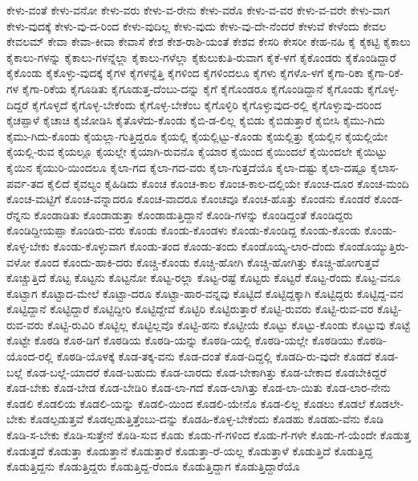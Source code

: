 {ಕೇಳು-ವಂತೆ
ಕೇಳು-ವನೋ
ಕೇಳು-ವರು
ಕೇಳು-ವ-ರೇನು
ಕೇಳು-ವರೊ
ಕೇಳು-ವ-ವರ
ಕೇಳು-ವ-ವರೇ
ಕೇಳು-ವಾಗ
ಕೇಳು-ವುದಕ್ಕೆ
ಕೇಳು-ವು-ದ-ರಿಂದ
ಕೇಳು-ವುದಿಲ್ಲ
ಕೇಳು-ವುದು
ಕೇಳು-ವು-ದೇ-ನೆಂದರೆ
ಕೇಳುವೆ
ಕೇಳೆಂದು
ಕೇವಲ
ಕೇವಲಮ್
ಕೇವಾ
ಕೇವಾ-ಕೀವಾ
ಕೇವಾಸೆ
ಕೇಶ
ಕೇಶ-ರಾಶಿ-ಯಂತೆ
ಕೇಶವ
ಕೇಸರಿ
ಕೇಸರೀ
ಕೇಹ-ನಹಿ
ಕೈ
ಕೈಕಟ್ಟಿ
ಕೈಕಾಲು
ಕೈಕಾಲು-ಗಳನ್ನು
ಕೈಕಾಲು-ಗಳನ್ನೆಲ್ಲಾ
ಕೈಕಾಲು-ಗಳೆಲ್ಲಾ
ಕೈಕುಲುಕುತಿ-ರುವಾಗ
ಕೈಕೆ-ಳಗೆ
ಕೈಕೊಂಡರು
ಕೈಕೊಂಡಿದ್ದಾರೆ
ಕೈಕೊಂಡು
ಕೈಕೊಳ್ಳು-ವುದಕ್ಕೆ
ಕೈಗಳ
ಕೈಗಳನ್ನೆತ್ತಿ
ಕೈಗಳಿಂದ
ಕೈಗಳಿಂದಲೂ
ಕೈಗಳು
ಕೈಗಳೊ-ಳಗೆ
ಕೈಗಾ-ರಿಕಾ
ಕೈಗಾ-ರಿಕೆ-ಗಳ
ಕೈಗಾ-ರಿಕೆಯ
ಕೈಗೂಡಿತು
ಕೈಗೂಡುತ್ತ-ದೆಂಬು-ದನ್ನು
ಕೈಗೆ
ಕೈಗೊಂಡರೂ
ಕೈಗೊಂಡಿದ್ದಾನೆ
ಕೈಗೊಂಡು
ಕೈಗೊಳ್ಳ-ದಿದ್ದರೆ
ಕೈಗೊಳ್ಳದೆ
ಕೈಗೊಳ್ಳ-ಬೇಕೆಂದು
ಕೈಗೊಳ್ಳ-ಬೇಕೆಂಬ
ಕೈಗೊಳ್ಳಿರಿ
ಕೈಗೊಳ್ಳುವುದ-ರಲ್ಲಿ
ಕೈಗೊಳ್ಳುವು-ದರಿಂದ
ಕೈಚಪ್ಪಾಳೆ
ಕೈಚಾಚಿ
ಕೈಜೋಡಿಸಿ
ಕೈತೊಳೆದು-ಕೊಂಡು
ಕೈಬಿ-ಡ-ಲಿಲ್ಲ
ಕೈಬಿಡು
ಕೈಬಿಡುತ್ತಾರೆ
ಕೈಬೀಸಿ
ಕೈಮು-ಗಿದು
ಕೈಮು-ಗಿದು-ಕೊಂಡು
ಕೈಯಲ್ಲಾ-ಗುತ್ತಿದ್ದರೂ
ಕೈಯಲ್ಲಿ
ಕೈಯಲ್ಲಿಟ್ಟು-ಕೊಂಡು
ಕೈಯಲ್ಲಿತ್ತು
ಕೈಯಲ್ಲಿನ
ಕೈಯಲ್ಲಿಯೇ
ಕೈಯಲ್ಲಿ-ರುವ
ಕೈಯಲ್ಲೂ
ಕೈಯಲ್ಲೇ
ಕೈಯಾಗಿ-ರುವನೊ
ಕೈಯಾರ
ಕೈಯಿಂದ
ಕೈಯಿಂದಲೆ
ಕೈಯಿಂದಲೇ
ಕೈಯಿಟ್ಟು
ಕೈಯಿನ
ಕೈಯುರಿ-ಯಿಂದಲೂ
ಕೈಲಾ-ಗದ
ಕೈಲಾ-ಗದ-ವರು
ಕೈಲಾ-ಗುತ್ತದೆಯೊ
ಕೈಲಾ-ದಷ್ಟು
ಕೈಲಾ-ದಷ್ಟೂ
ಕೈಲಾಸ-ಪರ್ವ-ತದ
ಕೈಲಿದೆ
ಕೈವಲ್ಯಂ
ಕೈಹಿಡಿದು
ಕೊಂಚ
ಕೊಂಚ-ಕಾಲ
ಕೊಂಚ-ಕಾಲ-ದಲ್ಲಿಯೇ
ಕೊಂಚ-ದೂರ
ಕೊಂಚ-ಮಂದಿ
ಕೊಂಚ-ಮಟ್ಟಿಗೆ
ಕೊಂಚ-ವನ್ನಾದರೂ
ಕೊಂಚ-ವಾದರೂ
ಕೊಂಚವೂ
ಕೊಂಚ-ಹೊತ್ತು
ಕೊಂಡನು
ಕೊಂಡರೆ
ಕೊಂಡ-ರೆನ್ನನು
ಕೊಂಡಾಡಿತು
ಕೊಂಡಾಡುತ್ತಾ
ಕೊಂಡಾಡುತ್ತಿದ್ದಾನೆ
ಕೊಂಡಿ-ಗಳನ್ನು
ಕೊಂಡಿದ್ದಂತೆ
ಕೊಂಡಿದ್ದರು
ಕೊಂಡಿದ್ದೀಯಪ್ಪಾ
ಕೊಂಡಿರು-ವರು
ಕೊಂಡು
ಕೊಂಡು-ಕೊಂಡಳು
ಕೊಂಡು-ಕೊಂಡಿದ್ದ
ಕೊಂಡು-ಕೊಂಡು
ಕೊಂಡು-ಕೊಳ್ಳ-ಬೇಕು
ಕೊಂಡು-ಕೊಳ್ಳುವಾಗ
ಕೊಂಡು-ತಂದ
ಕೊಂಡು-ತಂದು
ಕೊಂಡೊಯ್ಯ-ಲಾರ-ದೆಂದು
ಕೊಂಡೊಯ್ಯುತ್ತಿರು-ವಳೋ
ಕೊಂದ
ಕೊಂದು-ಹಾಕಿ-ದರು
ಕೊಚ್ಚಿ-ಕೊಂಡು
ಕೊಚ್ಚಿ-ಹೋಗಿ
ಕೊಚ್ಚಿ-ಹೋಗಿತ್ತು
ಕೊಚ್ಚಿ-ಹೋಗುತ್ತವೆ
ಕೊಚ್ಚುತ್ತಿದೆ
ಕೊಟ್ಟ
ಕೊಟ್ಟನು
ಕೊಟ್ಟನೋ
ಕೊಟ್ಟ-ರಲ್ಲಾ
ಕೊಟ್ಟ-ರಷ್ಟೆ
ಕೊಟ್ಟರು
ಕೊಟ್ಟರೆ
ಕೊಟ್ಟ-ರೆಂದು
ಕೊಟ್ಟ-ವನೂ
ಕೊಟ್ಟಾಗ
ಕೊಟ್ಟಾದ-ಮೇಲೆ
ಕೊಟ್ಟಾ-ದರೂ
ಕೊಟ್ಟಾ-ಹಾರ-ವನ್ನವು
ಕೊಟ್ಟಿದೆ
ಕೊಟ್ಟಿದ್ದಕ್ಕಾಗಿ
ಕೊಟ್ಟಿದ್ದರು
ಕೊಟ್ಟಿದ್ದ-ವನ
ಕೊಟ್ಟಿದ್ದಾನೆ
ಕೊಟ್ಟಿದ್ದಾರೆ
ಕೊಟ್ಟಿದ್ದೀರಿ
ಕೊಟ್ಟಿದ್ದೇವೆ
ಕೊಟ್ಟಿರಿ
ಕೊಟ್ಟಿರುತ್ತಾರೆ
ಕೊಟ್ಟಿ-ರುವರು
ಕೊಟ್ಟಿ-ರುವ-ವರ
ಕೊಟ್ಟಿ-ರುವ-ವರು
ಕೊಟ್ಟಿ-ರುವಿರಿ
ಕೊಟ್ಟಿಲ್ಲ
ಕೊಟ್ಟಿಲ್ಲವೊ
ಕೊಟ್ಟಿ-ಹನು
ಕೊಟ್ಟೀಯೆ
ಕೊಟ್ಟು
ಕೊಟ್ಟು-ಕೊಂಡು
ಕೊಟ್ಟುವು
ಕೊಟ್ಟೆ
ಕೊಟ್ಟೇ
ಕೊಠಡಿ
ಕೊಠ-ಡಿಗೆ
ಕೊಠಡಿಯ
ಕೊಠಡಿ-ಯನ್ನು
ಕೊಠಡಿ-ಯಲ್ಲಿ
ಕೊಠಡಿ-ಯಲ್ಲೇ
ಕೊಠಡಿಯು
ಕೊಠಡಿ-ಯೊಂದ-ರಲ್ಲಿ
ಕೊಠಡಿ-ಯೊಳಕ್ಕೆ
ಕೊಡ-ತಕ್ಕ-ವನು
ಕೊಡ-ದಂತೆ
ಕೊಡ-ದಿದ್ದಲ್ಲಿ
ಕೊಡದಿ-ರು-ವುದೇ
ಕೊಡದೆ
ಕೊಡ-ಬಲ್ಲೆ
ಕೊಡ-ಬಲ್ಲೆ-ಯಾದರೆ
ಕೊಡ-ಬಹುದು
ಕೊಡ-ಬಾರದು
ಕೊಡ-ಬೇಕಾಗಿತ್ತು
ಕೊಡ-ಬೇಕಾದ
ಕೊಡಬೇಕಿದ್ದರೆ
ಕೊಡ-ಬೇಕು
ಕೊಡ-ಬೇಡ
ಕೊಡ-ಬೇಡಿರಿ
ಕೊಡ-ಲಾ-ಗದೆ
ಕೊಡ-ಲಾಗಿತ್ತು
ಕೊಡ-ಲಾ-ಯಿತು
ಕೊಡ-ಲಾರ-ನೇನು
ಕೊಡಲಿ
ಕೊಡಲಿಯ
ಕೊಡಲಿ-ಯನ್ನು
ಕೊಡಲಿ-ಯಿಂದ
ಕೊಡಲಿ-ಯೇನೊ
ಕೊಡ-ಲಿಲ್ಲ
ಕೊಡಲು
ಕೊಡಲೆ
ಕೊಡಲೇ-ಬೇಕು
ಕೊಡಲ್ಪಡುತ್ತವೆ
ಕೊಡಲ್ಪಡುತ್ತಿತ್ತೆಂಬು-ದನ್ನು
ಕೊಡಹಿ-ಕೊಳ್ಳ-ಬೇಕೆಂದು
ಕೊಡಹು
ಕೊಡಹು-ವೆನು
ಕೊಡಿ
ಕೊಡಿ-ಸ-ಬೇಕು
ಕೊಡಿ-ಸುತ್ತೇನೆ
ಕೊಡಿ-ಸುವ
ಕೊಡು
ಕೊಡು-ಗೆ-ಗಳಿಂದ
ಕೊಡು-ಗೆ-ಗಳೇ
ಕೊಡು-ಗೆ-ಯೆಂದೇ
ಕೊಡುತ್ತ
ಕೊಡುತ್ತದೆ
ಕೊಡುತ್ತಾ
ಕೊಡುತ್ತಾನೆ
ಕೊಡುತ್ತಾರೆ
ಕೊಡುತ್ತಾ-ರೆ-ಯಲ್ಲ
ಕೊಡುತ್ತಾಳೆ
ಕೊಡುತ್ತಿದೆ
ಕೊಡುತ್ತಿದ್ದ
ಕೊಡುತ್ತಿದ್ದನು
ಕೊಡುತ್ತಿದ್ದರು
ಕೊಡುತ್ತಿದ್ದ-ರೆಂದೂ
ಕೊಡುತ್ತಿದ್ದಾಗ
ಕೊಡುತ್ತಿದ್ದಾರೆಯೊ
}
